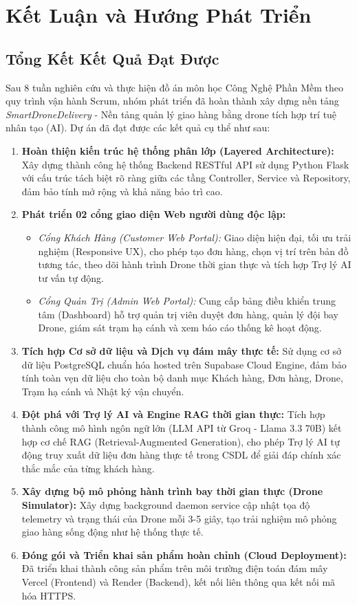 \chapter{Kết Luận và Hướng Phát Triển}

\section{Tổng Kết Kết Quả Đạt Được}

Sau 8 tuần nghiên cứu và thực hiện đồ án môn học Công Nghệ Phần Mềm theo quy trình vận hành Scrum, nhóm phát triển đã hoàn thành xây dựng nền tảng \textit{SmartDroneDelivery} - Nền tảng quản lý giao hàng bằng drone tích hợp trí tuệ nhân tạo (AI). Dự án đã đạt được các kết quả cụ thể như sau:

\begin{enumerate}[leftmargin=*]
  \item \textbf{Hoàn thiện kiến trúc hệ thống phân lớp (Layered Architecture):} Xây dựng thành công hệ thống Backend RESTful API sử dụng Python Flask với cấu trúc tách biệt rõ ràng giữa các tầng Controller, Service và Repository, đảm bảo tính mở rộng và khả năng bảo trì cao.
  \item \textbf{Phát triển 02 cổng giao diện Web người dùng độc lập:}
    \begin{itemize}
      \item \textit{Cổng Khách Hàng (Customer Web Portal):} Giao diện hiện đại, tối ưu trải nghiệm (Responsive UX), cho phép tạo đơn hàng, chọn vị trí trên bản đồ tương tác, theo dõi hành trình Drone thời gian thực và tích hợp Trợ lý AI tư vấn tự động.
      \item \textit{Cổng Quản Trị (Admin Web Portal):} Cung cấp bảng điều khiển trung tâm (Dashboard) hỗ trợ quản trị viên duyệt đơn hàng, quản lý đội bay Drone, giám sát trạm hạ cánh và xem báo cáo thống kê hoạt động.
    \end{itemize}
  \item \textbf{Tích hợp Cơ sở dữ liệu và Dịch vụ đám mây thực tế:} Sử dụng cơ sở dữ liệu PostgreSQL chuẩn hóa hosted trên Supabase Cloud Engine, đảm bảo tính toàn vẹn dữ liệu cho toàn bộ danh mục Khách hàng, Đơn hàng, Drone, Trạm hạ cánh và Nhật ký vận chuyển.
  \item \textbf{Đột phá với Trợ lý AI và Engine RAG thời gian thực:} Tích hợp thành công mô hình ngôn ngữ lớn (LLM API từ Groq - Llama 3.3 70B) kết hợp cơ chế RAG (Retrieval-Augmented Generation), cho phép Trợ lý AI tự động truy xuất dữ liệu đơn hàng thực tế trong CSDL để giải đáp chính xác thắc mắc của từng khách hàng.
  \item \textbf{Xây dựng bộ mô phỏng hành trình bay thời gian thực (Drone Simulator):} Xây dựng background daemon service cập nhật tọa độ telemetry và trạng thái của Drone mỗi 3-5 giây, tạo trải nghiệm mô phỏng giao hàng sống động như hệ thống thực tế.
  \item \textbf{Đóng gói và Triển khai sản phẩm hoàn chỉnh (Cloud Deployment):} Đã triển khai thành công sản phẩm trên môi trường điện toán đám mây Vercel (Frontend) và Render (Backend), kết nối liên thông qua kết nối mã hóa HTTPS.
\end{enumerate}


